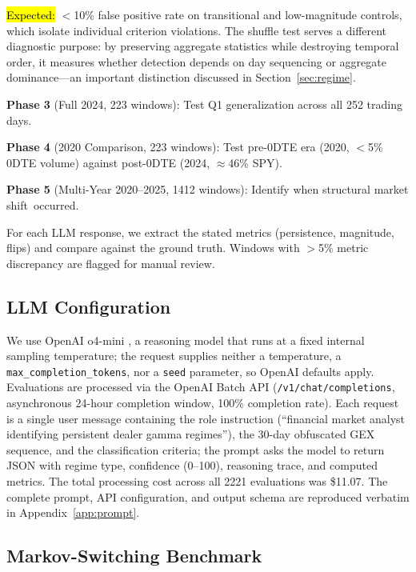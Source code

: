 \documentclass[jrfm,article,accept,moreauthors,pdftex]{Definitions/mdpi}
\begin{document}
\hl{Expected:} %
 $<$10\% false positive rate on transitional and low-magnitude controls, which isolate individual criterion violations. The shuffle test serves a different diagnostic purpose: by preserving aggregate statistics while destroying temporal order, it measures whether detection depends on day sequencing or aggregate dominance---an important distinction discussed in Section~\ref{sec:regime}.

\textbf{Phase 3} (Full 2024, 223 windows): Test Q1 generalization across all 252 trading days.

\textbf{Phase 4} (2020 Comparison, 223 windows): Test pre-0DTE era (2020, $<$5\% 0DTE volume) against post-0DTE (2024, $\approx$46\% SPY).

\textbf{Phase 5} (Multi-Year 2020--2025, 1412 windows): Identify when structural market \mbox{shift occurred.}

For each LLM response, we extract the stated metrics (persistence, magnitude, flips) and compare against the ground truth. Windows with $>$5\% metric discrepancy are flagged for manual review.

\subsection{LLM Configuration}

We use OpenAI o4-mini \citep{openai2024reasoning}, a reasoning model that runs at a fixed internal sampling temperature; the request supplies neither a temperature, a \texttt{max\_completion\_tokens}, nor a \texttt{seed} parameter, so OpenAI defaults apply. Evaluations are processed via the OpenAI Batch API (\texttt{/v1/chat/completions}, asynchronous 24-hour completion window, 100\% completion rate). Each request is a single user message containing the role instruction (``financial market analyst identifying persistent dealer gamma regimes''), the 30-day obfuscated GEX sequence, and the classification criteria; the prompt asks the model to return JSON with regime type, confidence (0--100), reasoning trace, and computed metrics. The total processing cost across all 2221 evaluations was \$11.07. The complete prompt, API configuration, and output schema are reproduced verbatim in Appendix~\ref{app:prompt}.

\subsection{Markov-Switching Benchmark}
\label{sec:methodology:benchmark}
\end{document}
